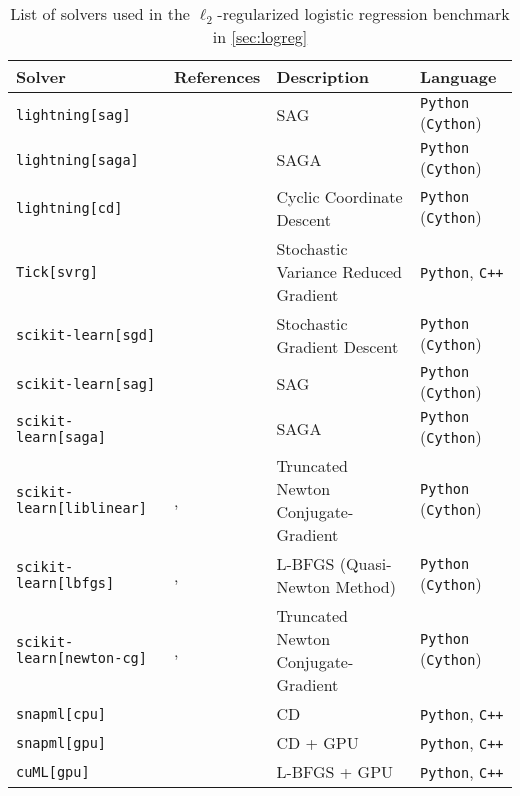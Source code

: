 \documentclass{article}
\begin{document}
\begin{table}[h]
  \centering
  \footnotesize
  \caption{List of solvers used in the $\ell_2$-regularized logistic regression benchmark in \autoref{sec:logreg}}
\begin{tabular}{l p{4.1cm} p{2cm} l}
  \toprule
  \textbf{Solver} & \textbf{References} &\textbf{Description} & \textbf{Language}\\
  \midrule
  \texttt{lightning[sag]} & \citet{Blondel2016}
                          & SAG
                          &\texttt{Python} (\texttt{Cython})\\
  \texttt{lightning[saga]} &\citet{Blondel2016}
                           & SAGA
                           & \texttt{Python} (\texttt{Cython})\\
  \texttt{lightning[cd]} & \citet{Blondel2016}
                         & Cyclic Coordinate Descent
                         & \texttt{Python} (\texttt{Cython})\\
  \texttt{Tick[svrg]} & \citet{Bacry2017}
                      & Stochastic Variance Reduced Gradient
                      & \texttt{Python}, \texttt{C++}\\
  \texttt{scikit-learn[sgd]} & \citet{Pedregosa_11}
                             & Stochastic Gradient Descent
                             & \texttt{Python} (\texttt{Cython})\\
  \texttt{scikit-learn[sag]} & \citet{Pedregosa_11}
                             & SAG
                             & \texttt{Python} (\texttt{Cython})\\
  \texttt{scikit-learn[saga]} & \citet{Pedregosa_11}
                              & SAGA
                              & \texttt{Python} (\texttt{Cython})\\
  \texttt{scikit-learn[liblinear]} &\citet{Pedregosa_11}, \citet{Fan2008}
                                   & Truncated Newton Conjugate-Gradient
                                   & \texttt{Python} (\texttt{Cython})\\
  \texttt{scikit-learn[lbfgs]} & \citet{Pedregosa_11}, \citet{2020SciPy-NMeth}
                               & L-BFGS (Quasi-Newton Method)
                               & \texttt{Python} (\texttt{Cython})\\
  \texttt{scikit-learn[newton-cg]} &\citet{Pedregosa_11}, \citet{2020SciPy-NMeth}
                     & Truncated Newton Conjugate-Gradient
                     & \texttt{Python} (\texttt{Cython})\\
  \texttt{snapml[cpu]} &\citet{Dunner_18}
                             & CD
                             & \texttt{Python}, \texttt{C++}\\
  \texttt{snapml[gpu]} & \citet{Dunner_18}
                            & CD + GPU
                            & \texttt{Python}, \texttt{C++}\\
  \texttt{cuML[gpu]} & \citet{Raschka2020a}
                     & L-BFGS + GPU
                     & \texttt{Python}, \texttt{C++}\\
  \bottomrule
\end{tabular}
\label{table:algo-logreg-benchmark}
\end{table}
\end{document}
